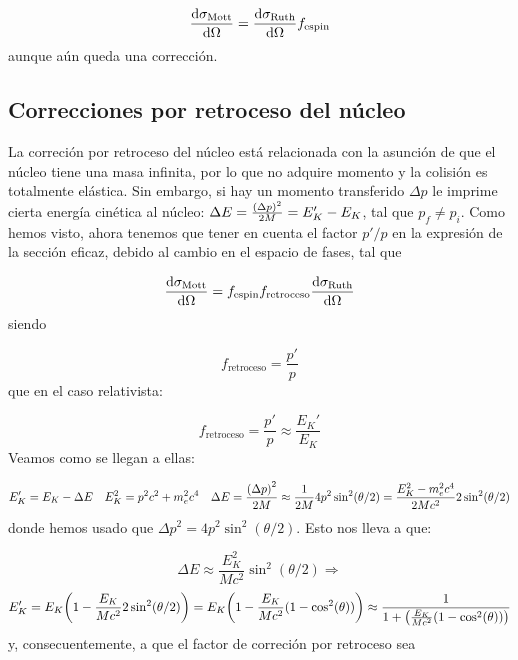 \begin{equation}
    \dv{\sigma_{\text{Mott}}}{\Omega} =  \dv{\sigma_{\text{Ruth}}}{\Omega}  f_{\text{espin}}
\end{equation}
aunque aún queda una corrección. 



\subsection{Correcciones por retroceso del núcleo}

La correción por retroceso del núcleo está relacionada con la asunción de que el núcleo tiene una masa infinita, por lo que no adquire momento y la colisión es totalmente elástica. Sin embargo, si hay un momento transferido $\Delta p$ le imprime cierta energía cinética al núcleo: $\Delta E = {\frac{\pqty{\Delta p}^2}{2M}} = E_K'-E_K$, tal que $p_f\neq p_i$. Como hemos visto, ahora tenemos que tener en cuenta el factor $p'/p$ en la expresión de la sección eficaz, debido al cambio en el espacio de fases, tal que

\begin{equation}
    \dv{\sigma_{\text{Mott}}}{\Omega} = f_{\text{espin}}f_{\text{retroceso}} \dv{\sigma_{\text{Ruth}}}{\Omega}  
\end{equation}
siendo 

\begin{equation}
    f_{\text{retroceso}} = \frac{p'}{p} 
\end{equation}
que en el caso relativista: 

\begin{equation}
    f_{\text{retroceso}} = \frac{p'}{p}  \approx  \frac{E_K'}{E_K}    
\end{equation}
Veamos como se llegan a ellas: 

\begin{equation}
    E_K' = E_K - \Delta E \quad E_K^2 = p^2 c^2 + m_e^2 c^4 \quad \Delta E = {\frac{\pqty{\Delta p}^2}{2M}} \approx \frac{1}{2M} 4 p^2 \sin^2 (\theta/2) = \frac{E_K^2-m_e^2c^4}{2Mc^2} 2 \sin^2 (\theta/2)
\end{equation}
donde hemos usado que $\Delta p^2 = 4 p^2 \sin^2 (\theta/2)$. Esto nos lleva a que:

\begin{equation*}
    \Delta E \approx \frac{E_K^2}{Mc^2} \sin^2 (\theta /2) \Longrightarrow
\end{equation*}
\begin{equation} E_K ' = E_K  \pqty{1 - \frac{E_K}{Mc^2} 2 \sin^2 (\theta/2)} = E_K \pqty{1 - \frac{E_K}{Mc^2} (1  - \cos^2 (\theta) )} \approx \frac{1}{1+\pqty{\frac{E_K}{Mc^2} (1  - \cos^2 (\theta) )}}
\end{equation}
y, consecuentemente, a que el factor de correción por retroceso sea

